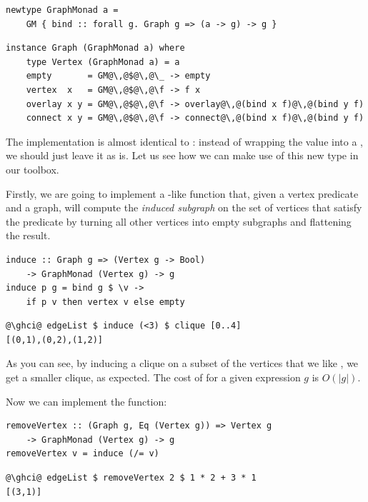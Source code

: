 \begin{verbatim}
newtype GraphMonad a =
    GM { bind :: forall g. Graph g => (a -> g) -> g }
\end{verbatim}
\vspace{1mm}
\begin{verbatim}
instance Graph (GraphMonad a) where
    type Vertex (GraphMonad a) = a
    empty       = GM@\,@$@\,@\_ -> empty
    vertex  x   = GM@\,@$@\,@\f -> f x
    overlay x y = GM@\,@$@\,@\f -> overlay@\,@(bind x f)@\,@(bind y f)
    connect x y = GM@\,@$@\,@\f -> connect@\,@(bind x f)@\,@(bind y f)
\end{verbatim}

The implementation is almost identical to : instead of
wrapping the value  into a , we should just leave it as is.
Let us see how we can make use of this new type in our toolbox.

Firstly, we are going to implement a -like function 
that, given a vertex predicate and a graph, will compute the \emph{induced subgraph}
on the set of vertices that satisfy the predicate by turning all other
vertices into empty subgraphs and flattening the result.

\begin{verbatim}
induce :: Graph g => (Vertex g -> Bool)
    -> GraphMonad (Vertex g) -> g
induce p g = bind g $ \v ->
    if p v then vertex v else empty
\end{verbatim}
\vspace{1mm}
\begin{verbatim}
@\ghci@ edgeList $ induce (<3) $ clique [0..4]
[(0,1),(0,2),(1,2)]
\end{verbatim}

\noindent
As you can see, by inducing a clique on a subset of the vertices
that we like , we get a smaller clique, as expected.
The cost of  for a given expression $g$ is $O(|g|)$.

Now we can implement the  function:

\begin{verbatim}
removeVertex :: (Graph g, Eq (Vertex g)) => Vertex g
    -> GraphMonad (Vertex g) -> g
removeVertex v = induce (/= v)
\end{verbatim}
\vspace{1mm}
\begin{verbatim}
@\ghci@ edgeList $ removeVertex 2 $ 1 * 2 + 3 * 1
[(3,1)]
\end{verbatim}

